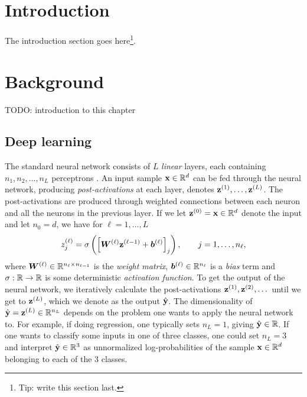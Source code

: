 \documentclass{statsmsc}
\begin{document}
\chapter{Introduction} %

The introduction section goes here\footnote{Tip: write this section last.}.


\chapter{Background} %

TODO: introduction to this chapter

\section{Deep learning}%
\label{sec:Deep learning}

The standard neural network consists of $L$ \textit{linear} layers, each containing
$n_1,n_2,\dots,n_L$ perceptrons \citep{dnn}. An input sample $\mathbf{x} \in \mathbb{R}^d$ can be fed
through the neural network, producing \textit{post-activations} at each layer, denotes
$\mathbf{z}^{(1)}, \dots, \mathbf{z}^{(L)}$. The post-activations are produced through weighted
connections between each neuron and all the neurons in the previous layer. If we let
$\mathbf{z}^{(0)}=\mathbf{x} \in \mathbb{R}^d$ denote the input and let $n_0=d$, we have for $\ell=1,\dots,L$
\begin{equation}\label{eq:nn_update}
    z_j^{(\ell)} = \sigma \left(\left[ \boldsymbol{W}^{(\ell)} \mathbf{z}^{(\ell-1)} + \boldsymbol{b}^{(\ell)} \right]_j \right),\qquad j=1,\dots,n_\ell,
\end{equation}
where $\boldsymbol{W}^{(\ell)} \in \mathbb{R}^{n_{\ell} \times n_{\ell-1}}$ is the \textit{weight matrix},
$\boldsymbol{b}^{(\ell)} \in \mathbb{R}^{n_{\ell}}$ is a \textit{bias} term and
$\sigma : \mathbb{R} \rightarrow {\mathbb{R}}$ is some deterministic \textit{activation function}.
To get the output of the neural network, we iteratively calculate the post-activations
$\mathbf{z}^{(1)},\mathbf{z}^{(2)},\dots$ until we get to $\mathbf{z}^{(L)}$, which we denote as the output
$\hat{\mathbf{y}}$. The dimensionality of $\hat{\mathbf{y}}=\mathbf{z}^{(L)} \in \mathbb{R}^{n_L}$
depends on the problem one wants
to apply the neural network to. For example, if doing regression, one typically sets
$n_L=1$, giving $\hat{\mathbf{y}} \in \mathbb{R}$. If one wants to classify some inputs in one of three classes,
one could set $n_L=3$ and interpret $\hat{\mathbf{y}} \in \mathbb{R}^3$ as unnormalized log-probabilities of
the sample $\mathbf{x} \in \mathbb{R}^d$ belonging to each of the 3 classes.
\end{document}
